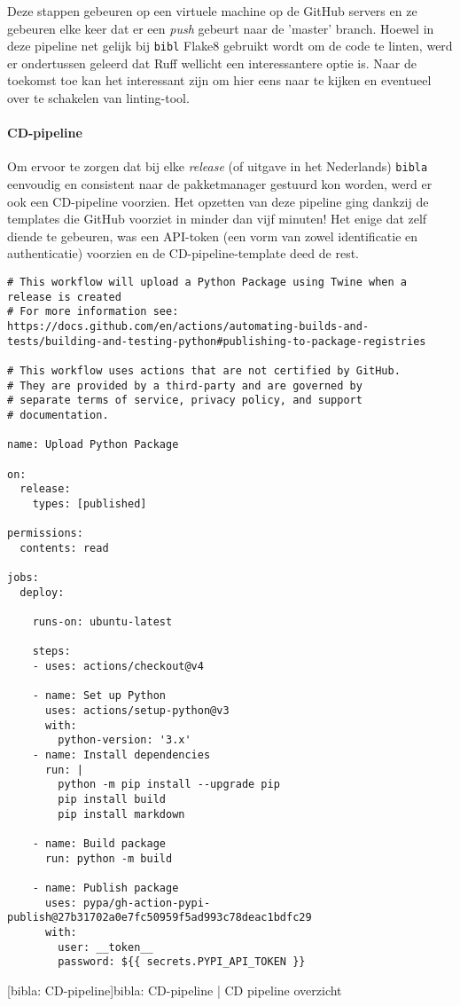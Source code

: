 Deze stappen gebeuren op een virtuele machine op de GitHub servers en ze gebeuren elke keer dat er een \emph{push} gebeurt naar de 'master' branch.
Hoewel in deze pipeline net gelijk bij \texttt{bibl} Flake8 gebruikt wordt om de code te linten, werd er ondertussen geleerd dat Ruff wellicht een interessantere optie is. Naar de toekomst toe kan het interessant zijn om hier eens naar te kijken en eventueel over te schakelen van linting-tool.


\paragraph{CD-pipeline}
Om ervoor te zorgen dat bij elke \emph{release} (of uitgave in het Nederlands) \texttt{bibla} eenvoudig en consistent naar de pakketmanager gestuurd kon worden, werd er ook een CD-pipeline voorzien. Het opzetten van deze pipeline ging dankzij de templates die GitHub voorziet in minder dan vijf minuten! Het enige dat zelf diende te gebeuren, was een \acrshort{API}-token (een vorm van zowel identificatie en authenticatie) voorzien en de CD-pipeline-template deed de rest.

\begin{verbatim}
# This workflow will upload a Python Package using Twine when a release is created
# For more information see: https://docs.github.com/en/actions/automating-builds-and-tests/building-and-testing-python#publishing-to-package-registries

# This workflow uses actions that are not certified by GitHub.
# They are provided by a third-party and are governed by
# separate terms of service, privacy policy, and support
# documentation.

name: Upload Python Package

on:
  release:
    types: [published]

permissions:
  contents: read

jobs:
  deploy:

    runs-on: ubuntu-latest

    steps:
    - uses: actions/checkout@v4

    - name: Set up Python
      uses: actions/setup-python@v3
      with:
        python-version: '3.x'
    - name: Install dependencies
      run: |
        python -m pip install --upgrade pip
        pip install build
        pip install markdown

    - name: Build package
      run: python -m build

    - name: Publish package
      uses: pypa/gh-action-pypi-publish@27b31702a0e7fc50959f5ad993c78deac1bdfc29
      with:
        user: __token__
        password: ${{ secrets.PYPI_API_TOKEN }}

\end{verbatim}
[bibla: \acrshort{CD}-pipeline]{bibla: \acrshort{CD}-pipeline | \acrfull{CD} pipeline overzicht \label{lst:bibla_CD}}

